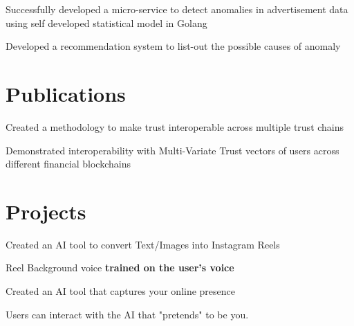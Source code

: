 \documentclass[]{deedy-resume-openfont}
\begin{document}
\begin{minipage}[t]{0.66\textwidth}
{}
\begin{tightemize}
\item Successfully developed a micro-service to detect anomalies in advertisement data using self developed statistical model in Golang
\item Developed a recommendation system to list-out the possible causes of anomaly
\end{tightemize}



\section{Publications}
\begin{tightemize}
\item Created a methodology to make trust interoperable across multiple trust chains
\item Demonstrated interoperability with Multi-Variate Trust vectors of users across different financial blockchains
\end{tightemize}

\section{Projects}
\begin{tightemize}
\item Created an AI tool to convert Text/Images into Instagram Reels \\
\item Reel Background voice \textbf{trained on the user's voice}
\end{tightemize}
\sectionsep

\begin{tightemize}
\item Created an AI tool that captures your online presence \\
\item Users can interact with the AI that "pretends" to be you.
\end{tightemize}
\sectionsep


\end{minipage}
\end{document}
